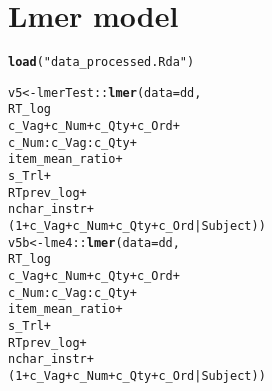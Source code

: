 \documentclass[a4paper]{article}\usepackage[]{graphicx}\usepackage[]{color}
\makeatletter
\newcommand{\hlnum}[1]{\textcolor[rgb]{0.686,0.059,0.569}{#1}}%
\newcommand{\hlstr}[1]{\textcolor[rgb]{0.192,0.494,0.8}{#1}}%
\newcommand{\hlopt}[1]{\textcolor[rgb]{0,0,0}{#1}}%
\newcommand{\hlstd}[1]{\textcolor[rgb]{0.345,0.345,0.345}{#1}}%
\newcommand{\hlkwb}[1]{\textcolor[rgb]{0.69,0.353,0.396}{#1}}%
\newcommand{\hlkwc}[1]{\textcolor[rgb]{0.333,0.667,0.333}{#1}}%
\newcommand{\hlkwd}[1]{\textcolor[rgb]{0.737,0.353,0.396}{\textbf{#1}}}%
\newenvironment{kframe}{%
 \def\at@end@of@kframe{}%
 \ifinner\ifhmode%
  \def\at@end@of@kframe{\end{minipage}}%
  \begin{minipage}{\columnwidth}%
 \fi\fi%
 \def\FrameCommand##1{\hskip\@totalleftmargin \hskip-\fboxsep
 \colorbox{shadecolor}{##1}\hskip-\fboxsep
     \hskip-\linewidth \hskip-\@totalleftmargin \hskip\columnwidth}%
 \MakeFramed {\advance\hsize-\width
   \@totalleftmargin\z@ \linewidth\hsize
   \@setminipage}}%
 {\par\unskip\endMakeFramed%
 \at@end@of@kframe}
\newenvironment{knitrout}{}{} %
\makeatother
\begin{document}
\FloatBarrier
\section{Lmer model}

\begin{knitrout}
\color{fgcolor}\begin{kframe}
\begin{alltt}
\hlkwd{load}\hlstd{(}\hlstr{"data_processed.Rda"}\hlstd{)}
\end{alltt}
\end{kframe}
\end{knitrout}

\begin{knitrout}
\color{fgcolor}\begin{kframe}
\begin{alltt}
\hlstd{v5} \hlkwb{<-} \hlstd{lmerTest}\hlopt{::}\hlkwd{lmer}\hlstd{(}\hlkwc{data}\hlstd{=dd,}
\hlstd{RT_log} \hlopt{~}
\hlstd{c_Vag} \hlopt{+} \hlstd{c_Num} \hlopt{+} \hlstd{c_Qty} \hlopt{+} \hlstd{c_Ord} \hlopt{+}
\hlstd{c_Num}\hlopt{:}\hlstd{c_Vag}\hlopt{:}\hlstd{c_Qty} \hlopt{+}
\hlstd{item_mean_ratio} \hlopt{+}
\hlstd{s_Trl} \hlopt{+}
\hlstd{RTprev_log} \hlopt{+}
\hlstd{nchar_instr} \hlopt{+}
\hlstd{(}\hlnum{1}\hlopt{+}\hlstd{c_Vag} \hlopt{+} \hlstd{c_Num} \hlopt{+} \hlstd{c_Qty} \hlopt{+} \hlstd{c_Ord}\hlopt{|}\hlstd{Subject))}
\hlstd{v5b} \hlkwb{<-} \hlstd{lme4}\hlopt{::}\hlkwd{lmer}\hlstd{(}\hlkwc{data}\hlstd{=dd,}
\hlstd{RT_log} \hlopt{~}
\hlstd{c_Vag} \hlopt{+} \hlstd{c_Num} \hlopt{+} \hlstd{c_Qty} \hlopt{+} \hlstd{c_Ord} \hlopt{+}
\hlstd{c_Num}\hlopt{:}\hlstd{c_Vag}\hlopt{:}\hlstd{c_Qty} \hlopt{+}
\hlstd{item_mean_ratio} \hlopt{+}
\hlstd{s_Trl} \hlopt{+}
\hlstd{RTprev_log} \hlopt{+}
\hlstd{nchar_instr} \hlopt{+}
\hlstd{(}\hlnum{1}\hlopt{+}\hlstd{c_Vag} \hlopt{+} \hlstd{c_Num} \hlopt{+} \hlstd{c_Qty} \hlopt{+} \hlstd{c_Ord}\hlopt{|}\hlstd{Subject))}
\end{alltt}
\end{kframe}
\end{knitrout}
\end{document}
